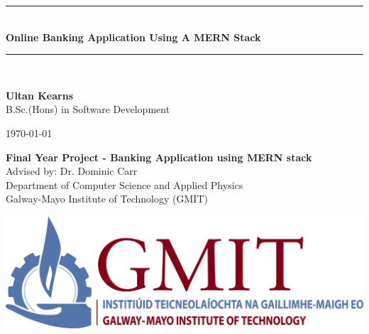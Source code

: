 \documentclass[12pt,a4paper,oneside,openany]{book}
\newcommand{\projecttitle}{Online Banking Application Using A MERN Stack}
\newcommand{\projectauthor}{Ultan Kearns}
\newcommand{\projectadvisor}{Dr. Dominic Carr}
\newcommand{\projectprogramme}{B.Sc.(Hons) in Software Development}
\newcommand{\projectdate}{\today}
\begin{document}
  \begin{titlepage}
    \begin{minipage}[t][6cm]{\textwidth}
      \centering
      \rule{\linewidth}{0.5mm} \\[0.4cm]
      { \LARGE \bfseries \projecttitle \\[0.4cm] }
      \rule{\linewidth}{0.5mm} \\[0.8cm]
    \end{minipage}

    \begin{minipage}[t][6.5cm]{\textwidth}
      \centering
      \textbf{\projectauthor}\\[0.5cm]
      \projectprogramme
    \end{minipage}

    \begin{minipage}[t][1cm]{\textwidth}
      \centering
      \textsc{\projectdate}
    \end{minipage}

    \begin{minipage}[t][3cm]{\textwidth}
      \centering
      \textbf{Final Year Project - Banking Application using MERN stack}\\[0.3cm]
      Advised by: \projectadvisor \\[0.1cm]
      Department of Computer Science and Applied Physics\\
      Galway-Mayo Institute of Technology (GMIT)
     \end{minipage}
    \begin{center}
    \includegraphics{img/gmit-logo.jpg}
    \end{center}
  \end{titlepage}
  \setcounter{page}{2}
  \tableofcontents
  
\end{document}
